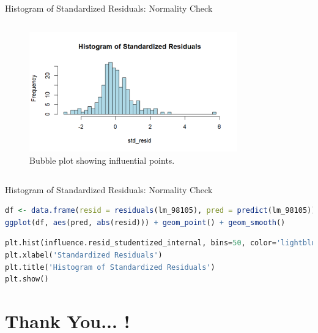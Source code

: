 \documentclass{beamer}
\begin{document}
	\begin{frame}{Histogram of Standardized Residuals: Normality Check}
		\begin{columns}
			
			\begin{figure}
				\includegraphics[width=0.8\textwidth]{histo.png}
				\caption{Bubble plot showing influential points.}
			\end{figure}
		\end{columns}
	\end{frame}

\begin{frame}[fragile]{Histogram of Standardized Residuals: Normality Check}
	\begin{itemize}
	\end{itemize}
	
	\begin{lstlisting}[language=R, caption=Histogram of Standardized Residuals in R]
df <- data.frame(resid = residuals(lm_98105), pred = predict(lm_98105))
ggplot(df, aes(pred, abs(resid))) + geom_point() + geom_smooth()
	\end{lstlisting}
	\begin{lstlisting}[language=Python, caption=Histogram of Standardized Residuals in Python]
plt.hist(influence.resid_studentized_internal, bins=50, color='lightblue')
plt.xlabel('Standardized Residuals')
plt.title('Histogram of Standardized Residuals')
plt.show()
	\end{lstlisting}
\end{frame}
	
	\section{Thank You... ! }
	
\end{document}

